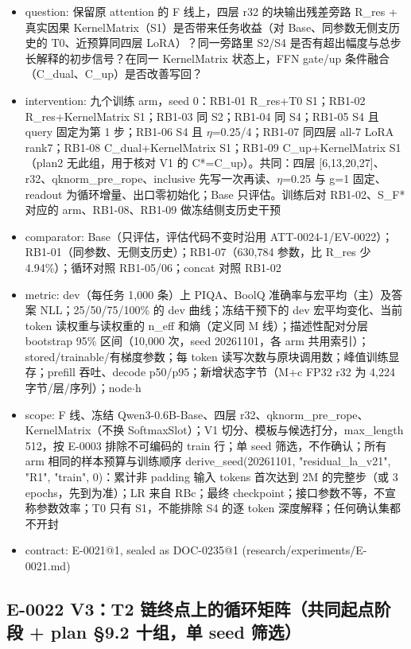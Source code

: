 \documentclass[11pt]{article}
\begin{document}
\begin{itemize}
\item question: 保留原 attention 的 F 线上，四层 r32 的块输出残差旁路 R\_res + 真实因果 KernelMatrix（S1）是否带来任务收益（对 Base、同参数无侧支历史的 T0、近预算同四层 LoRA）？同一旁路里 S2/S4 是否有超出幅度与总步长解释的初步信号？在同一 KernelMatrix 状态上，FFN gate/up 条件融合（C\_dual、C\_up）是否改善写回？
\item intervention: 九个训练 arm，seed 0：RB1-01 R\_res+T0 S1；RB1-02 R\_res+KernelMatrix S1；RB1-03 同 S2；RB1-04 同 S4；RB1-05 S4 且 query 固定为第 1 步；RB1-06 S4 且 \ensuremath{\eta}=0.25/4；RB1-07 同四层 all-7 LoRA rank7；RB1-08 C\_dual+KernelMatrix S1；RB1-09 C\_up+KernelMatrix S1（plan2 无此组，用于核对 V1 的 C*=C\_up）。共同：四层 [6,13,20,27]、r32、qknorm\_pre\_rope、inclusive 先写一次再读、\ensuremath{\eta}=0.25 与 g=1 固定、readout 为循环增量、出口零初始化；Base 只评估。训练后对 RB1-02、S\_F* 对应的 arm、RB1-08、RB1-09 做冻结侧支历史干预
\item comparator: Base（只评估，评估代码不变时沿用 ATT-0024-1/EV-0022）；RB1-01（同参数、无侧支历史）；RB1-07（630,784 参数，比 R\_res 少 4.94\%）；循环对照 RB1-05/06；concat 对照 RB1-02
\item metric: dev（每任务 1,000 条）上 PIQA、BoolQ 准确率与宏平均（主）及答案 NLL；25/50/75/100\% 的 dev 曲线；冻结干预下的 dev 宏平均变化、当前 token 读权重与读权重的 n\_eff 和熵（定义同 M 线）；描述性配对分层 bootstrap 95\% 区间（10,000 次，seed 20261101，各 arm 共用索引）；stored/trainable/有梯度参数；每 token 读写次数与原块调用数；峰值训练显存；prefill 吞吐、decode p50/p95；新增状态字节（M+c FP32 r32 为 4,224 字节/层/序列）；node\ensuremath{\cdot}h
\item scope: F 线、冻结 Qwen3-0.6B-Base、四层 r32、qknorm\_pre\_rope、KernelMatrix（不换 SoftmaxSlot）；V1 切分、模板与候选打分，max\_length 512，按 E-0003 排除不可编码的 train 行；单 seed 筛选，不作确认；所有 arm 相同的样本预算与训练顺序 derive\_seed(20261101, "residual\_la\_v21", "R1", "train", 0)：累计非 padding 输入 tokens 首次达到 2M 的完整步（或 3 epochs，先到为准）；LR 来自 RBc；最终 checkpoint；接口参数不等，不宣称参数效率；T0 只有 S1，不能排除 S4 的逐 token 深度解释；任何确认集都不开封
\item contract: E-0021@1, sealed as DOC-0235@1 (research/experiments/E-0021.md)
\end{itemize}

\subsection*{E-0022 V3：T2 链终点上的循环矩阵（共同起点阶段 + plan §9.2 十组，单 seed 筛选）}
\end{document}
